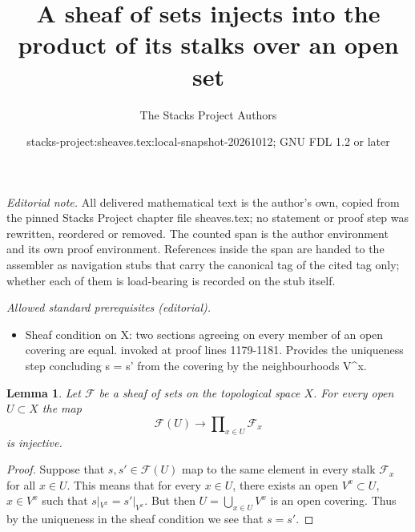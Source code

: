 \documentclass{stacks-project}
\title{A sheaf of sets injects into the product of its stalks over an open set}
\author{The Stacks Project Authors}
\date{stacks-project:sheaves.tex:local-snapshot-20261012; GNU FDL 1.2 or later}
\theoremstyle{plain}
\newtheorem{lemma}[subsection]{Lemma}
\theoremstyle{definition}
\theoremstyle{remark}
\numberwithin{equation}{subsection}
\begin{document}
\maketitle
\setcounter{subsection}{1}
\noindent\textit{Editorial note.} All delivered mathematical text is the author's own, copied from the pinned Stacks Project chapter file sheaves.tex; no statement or proof step was rewritten, reordered or removed. The counted span is the author environment and its own proof environment. References inside the span are handed to the assembler as navigation stubs that carry the canonical tag of the cited tag only; whether each of them is load-bearing is recorded on the stub itself.\par\medskip
\noindent\textit{Allowed standard prerequisites (editorial).}\begin{itemize}
\item Sheaf condition on X: two sections agreeing on every member of an open covering are equal. invoked at proof lines 1179-1181. Provides the uniqueness step concluding s = s' from the covering by the neighbourhoods V\textasciicircum{}x.
\end{itemize}\medskip
\begin{lemma}
\label{lemma-sheaf-subset-stalks}
Let $\mathcal{F}$ be a sheaf of sets on the topological space $X$.
For every open $U \subset X$ the map
$$
\mathcal{F}(U)
\longrightarrow
\prod\nolimits_{x \in U} \mathcal{F}_x
$$
is injective.
\end{lemma}

\begin{proof}
Suppose that $s, s' \in \mathcal{F}(U)$ map to the same element
in every stalk $\mathcal{F}_x$ for all $x \in U$. This means that
for every $x \in U$, there exists an open $V^x \subset U$,
$x \in V^x$ such that $s|_{V^x} = s'|_{V^x}$. But then
$U = \bigcup_{x \in U} V^x$ is an open covering. Thus by the
uniqueness in the sheaf condition we see that $s = s'$.
\end{proof}
\end{document}
